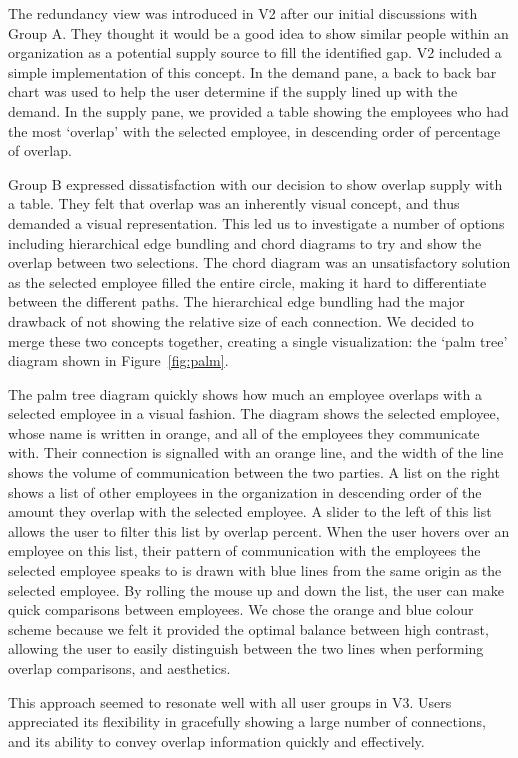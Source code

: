 \documentclass[journal]{vgtc}                %
\begin{document}
The redundancy view was introduced in V2 after our initial discussions with Group A.  They thought it would be a good idea to show similar people within an organization as a potential supply source to fill the identified gap. V2 included a simple implementation of this concept. In the demand pane, a back to back bar chart was used to help the user determine if the supply lined up with the demand. In the supply pane, we provided a table showing the employees who had the most \lq overlap\rq{} with the selected employee, in descending order of percentage of overlap.

Group B expressed dissatisfaction with our decision to show overlap supply with a table. They felt that overlap was an inherently visual concept, and thus demanded a visual representation. This led us to investigate a number of options including hierarchical edge bundling and chord diagrams to try and show the overlap between two selections.  The chord diagram was an unsatisfactory solution as the selected employee filled the entire circle, making it hard to differentiate between the different paths.  The hierarchical edge bundling had the major drawback of not showing the relative size of each connection.  We decided to merge these two concepts together, creating a single visualization: the \lq palm tree\rq{} diagram shown in Figure~\ref{fig:palm}.

The palm tree diagram quickly shows how much an employee overlaps with a selected employee in a visual fashion. The diagram shows the selected employee, whose name is written in orange, and all of the employees they communicate with. Their connection is signalled with an orange line, and the width of the line shows the volume of communication between the two parties. A list on the right shows a list of other employees in the organization in descending order of the amount they overlap with the selected employee. A slider to the left of this list allows the user to filter this list by overlap percent. When the user hovers over an employee on this list, their pattern of communication with the employees the selected employee speaks to is drawn with blue lines from the same origin as the selected employee. By rolling the mouse up and down the list, the user can make quick comparisons between employees. We chose the orange and blue colour scheme because we felt it provided the optimal balance between high contrast, allowing the user to easily distinguish between the two lines when performing overlap comparisons, and aesthetics. 

This approach seemed to resonate well with all user groups in V3.  Users appreciated its flexibility in gracefully showing a large number of connections, and its ability to convey overlap information quickly and effectively. 
\end{document}
